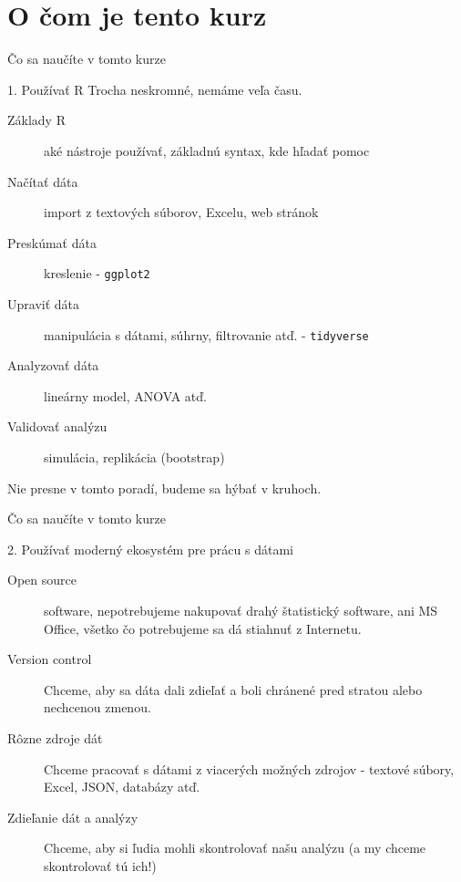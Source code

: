 \section{O čom je tento kurz}
\begin{frame}{Čo sa naučíte v tomto kurze}
	\begin{block}{1. Používať R}
		Trocha neskromné, nemáme veľa času.
		\begin{description}
			\item[Základy R] aké nástroje používať, základnú syntax, kde hľadať pomoc
			\item[Načítať dáta] import z textových súborov, Excelu, web stránok
			\item[Preskúmať dáta] kreslenie - \texttt{ggplot2}
			\item[Upraviť dáta] manipulácia s dátami, súhrny, filtrovanie atď. - \texttt{tidyverse}
			\item[Analyzovať dáta] lineárny model, ANOVA atď.
			\item[Validovať analýzu] simulácia, replikácia (bootstrap)
		\end{description}
		Nie presne v tomto poradí, budeme sa hýbať v kruhoch.
	\end{block}
\end{frame}

\begin{frame}{Čo sa naučíte v tomto kurze}
	\begin{block}{2. Používať moderný ekosystém pre prácu s dátami}
		\begin{description}
			\item[Open source] software, nepotrebujeme nakupovať drahý štatistický software, ani MS Office, všetko čo potrebujeme sa dá stiahnuť z Internetu.
			\item[Version control] Chceme, aby sa dáta dali zdieľať a boli chránené pred stratou alebo nechcenou zmenou.
			\item[Rôzne zdroje dát] Chceme pracovať s dátami z viacerých možných zdrojov - textové súbory, Excel, JSON, databázy atď.
			\item[Zdieľanie dát a analýzy] Chceme, aby si ľudia mohli skontrolovať našu analýzu (a my chceme skontrolovať tú ich!)
		\end{description}
	\end{block}
\end{frame}



